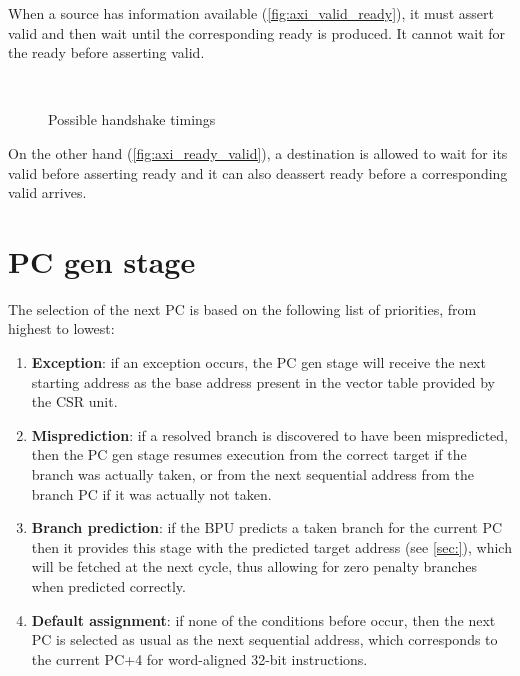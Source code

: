When a source has information available (\cref{fig:axi_valid_ready}), it must assert valid and then wait until the corresponding ready is produced. It cannot wait for the ready before asserting valid.
\begin{figure}[hbt]
  \centering
   \\
  \caption{Possible handshake timings}
  \label{fig:axi_timings}
\end{figure}
On the other hand (\cref{fig:axi_ready_valid}), a destination is allowed to wait for its valid before asserting ready and it can also deassert ready before a corresponding valid arrives.

\section{\acs{PC} gen stage}
The selection of the next \ac{PC} is based on the following list of priorities, from highest to lowest:
\begin{enumerate}
  \item \textbf{Exception}: if an exception occurs, the \ac{PC} gen stage will receive the next starting address as the base address present in the vector table provided by the {\smaller CSR} unit.
  \item \textbf{Misprediction}: if a resolved branch is discovered to have been mispredicted, then the \ac{PC} gen stage resumes execution from the correct target if the branch was actually taken, or from the next sequential address from the branch \ac{PC} if it was actually not taken.
  \item \textbf{Branch prediction}: if the \ac{BPU} predicts a taken branch for the current \ac{PC} then it provides this stage with the predicted target address (see \cref{sec:}), which will be fetched at the next cycle, thus allowing for zero penalty branches when predicted correctly.
  \item \textbf{Default assignment}: if none of the conditions before occur, then the next \ac{PC} is selected as usual as the next sequential address, which corresponds to the current \ac{PC}+4 for word-aligned 32-bit instructions.
\end{enumerate}

